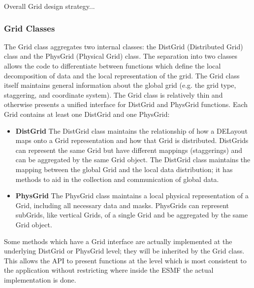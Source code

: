 

Overall Grid design strategy...

\subsubsection{Grid Classes}
The Grid class aggregates two internal classes: the DistGrid (Distributed
Grid) class and the PhysGrid (Physical Grid) class.  The separation into two
classes allows the code to differentiate between functions which define the
local decomposition of data and the local representation of the grid.  The Grid
class itself maintains general information about the global grid (e.g. the
grid type, staggering, and coordinate system).  The Grid class is relatively
thin and otherwise presents a unified interface for DistGrid and PhysGrid
functions.  Each Grid contains at least one DistGrid and one PhysGrid:
\begin{itemize}
\item {\bf DistGrid} The DistGrid class maintains the relationship of how
a DELayout maps onto a Grid representation and how that Grid is distributed.
DistGrids can represent the same Grid but have different mappings (staggerings)
and can be aggregated by the same Grid object. The DistGrid class maintains the
mapping between the global Grid and the local data distribution;  it has
methods to aid in the collection and communication of global data.
\item {\bf PhysGrid} The PhysGrid class maintains a local physical
representation of a Grid, including all necessary data and masks.  PhysGrids
can represent subGrids, like vertical Grids, of a single Grid and be
aggregated by the same Grid object.
\end{itemize}

Some methods which have a Grid interface are actually implemented
at the underlying DistGrid or PhysGrid level; they will be inherited
by the Grid class.  This allows the API to present functions at the 
level which is most consistent to the application without restricting
where inside the ESMF the actual implementation is done.

